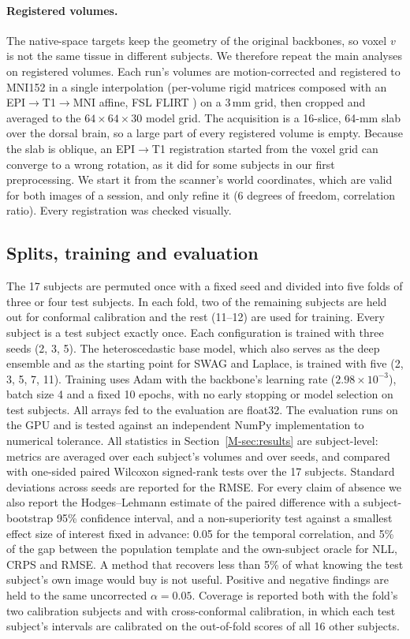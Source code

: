 \paragraph{Registered volumes.} The native-space targets keep the geometry of the original backbones, so voxel $v$ is not the same tissue in different subjects. We therefore repeat the main analyses on registered volumes. Each run's volumes are motion-corrected and registered to MNI152 in a single interpolation (per-volume rigid matrices composed with an EPI$\to$T1$\to$MNI affine, FSL FLIRT \citep{jenkinson2002improved}) on a 3\,mm grid, then cropped and averaged to the $64\times64\times30$ model grid. The acquisition is a 16-slice, 64-mm slab over the dorsal brain, so a large part of every registered volume is empty. Because the slab is oblique, an EPI$\to$T1 registration started from the voxel grid can converge to a wrong rotation, as it did for some subjects in our first preprocessing. We start it from the scanner's world coordinates, which are valid for both images of a session, and only refine it (6 degrees of freedom, correlation ratio). Every registration was checked visually.

\subsection{Splits, training and evaluation}
The 17 subjects are permuted once with a fixed seed and divided into five folds of three or four test subjects. In each fold, two of the remaining subjects are held out for conformal calibration and the rest (11--12) are used for training. Every subject is a test subject exactly once. Each configuration is trained with three seeds (2, 3, 5). The heteroscedastic base model, which also serves as the deep ensemble and as the starting point for SWAG and Laplace, is trained with five (2, 3, 5, 7, 11). Training uses Adam with the backbone's learning rate ($2.98\times10^{-3}$), batch size 4 and a fixed 10 epochs, with no early stopping or model selection on test subjects. All arrays fed to the evaluation are float32. The evaluation runs on the GPU and is tested against an independent NumPy implementation to numerical tolerance. All statistics in Section~\ref{M-sec:results} are subject-level: metrics are averaged over each subject's volumes and over seeds, and compared with one-sided paired Wilcoxon signed-rank tests over the 17 subjects. Standard deviations across seeds are reported for the RMSE. For every claim of absence we also report the Hodges--Lehmann estimate of the paired difference with a subject-bootstrap 95\% confidence interval, and a non-superiority test against a smallest effect size of interest fixed in advance: 0.05 for the temporal correlation, and 5\% of the gap between the population template and the own-subject oracle for NLL, CRPS and RMSE. A method that recovers less than 5\% of what knowing the test subject's own image would buy is not useful. Positive and negative findings are held to the same uncorrected $\alpha=0.05$. Coverage is reported both with the fold's two calibration subjects and with cross-conformal calibration, in which each test subject's intervals are calibrated on the out-of-fold scores of all 16 other subjects.

